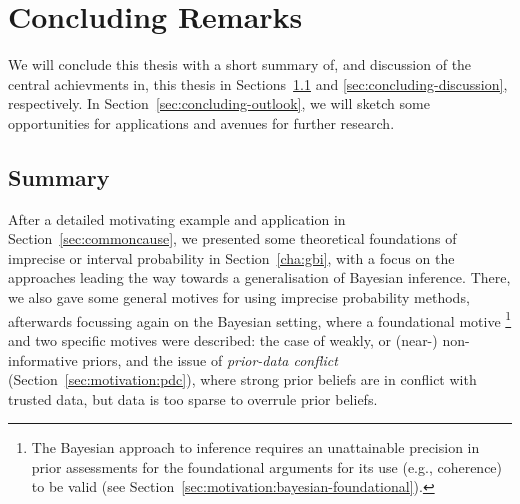 \chapter{Concluding Remarks}
\label{cha:concluding}

We will conclude this thesis with a short summary of, and discussion of the central achievments in, this thesis
in Sections~\ref{sec:concluding-summary} and \ref{sec:concluding-discussion}, respectively.
In Section~\ref{sec:concluding-outlook}, we will sketch some opportunities for applications and avenues for further research.


\section{Summary}
\label{sec:concluding-summary}


After a detailed motivating example and application in Section~\ref{sec:commoncause},
we presented some theoretical foundations of imprecise or interval probability in Section~\ref{cha:gbi},
with a focus on the approaches leading the way towards a generalisation of Bayesian inference.
There, we also gave some general motives for using imprecise probability methods,
afterwards focussing again on the Bayesian setting, where a foundational motive%
\footnote{The Bayesian approach to inference
requires an unattainable precision in prior assessments
for the foundational arguments for its use (e.g., coherence) to be valid
(see Section~\ref{sec:motivation:bayesian-foundational}).}
and two specific motives were described:
the case of weakly, or (near-) non-informative priors,
and the issue of \emph{prior-data conflict} (Section~\ref{sec:motivation:pdc}),
where strong prior beliefs are in conflict with trusted data,
but data is too sparse to overrule prior beliefs.

